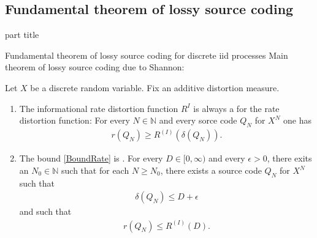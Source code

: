\subsection{Fundamental theorem of lossy source coding}
\begin{frame}
 \vspace{12.0ex}
\begin{center}
\begin{beamercolorbox}[sep=12pt,center]{part title}
\insertsubsection\par
\end{beamercolorbox}
\end{center}
\end{frame}
\begin{frame}{Fundamental theorem of lossy source coding for discrete iid processes}
Main theorem of lossy source coding due to Shannon: 
\begin{theorem}
Let $X$ be a discrete random variable. Fix an additive distortion measure. 
\begin{enumerate}
\item The informational rate distortion function $R^{I}$ is always a  for the rate distortion function: 
For every $N\in\mathbb{N}$ and every sorce code $Q_N$ for $X^N$ one has  
\begin{align}\label{BoundRate}
r(Q_N)\geq R^{(I)}(\delta(Q_N)). 
\end{align}
\item The bound \eqref{BoundRate} is . For every $D\in[0,\infty)$ and every $\epsilon>0$, there exits an $N_0\in\mathbb{N}$ such that for each $N\geq N_0$, there 
exists a source code $Q_N$ for $X^N$ such that 
\begin{align*}
\delta(Q_N)\leq D+\epsilon
\end{align*}
and such that
\begin{align*}
r(Q_{N})\leq R^{(I)}(D). 
\end{align*}
\end{enumerate}
\end{theorem}
\end{frame}

